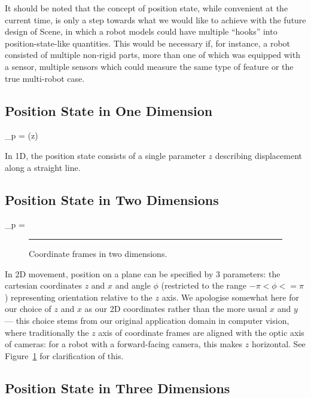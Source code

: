 \documentclass{article}
\begin{document}
It should be noted that the concept of position state, while
convenient at the current time, is only a step towards what we would
like to achieve with the future design of Scene, in which a robot
models could have multiple ``hooks'' into position-state-like
quantities. This would be necessary if, for instance, a robot
consisted of multiple non-rigid parts, more than one of which was
equipped with a sensor, multiple sensors which could measure the same
type of feature or the true multi-robot case.

\subsection{Position State in One Dimension}

\beq
\vecx_p = (z)
\eeq

In 1D, the position state consists of a single parameter $z$
describing displacement along a straight line.

\subsection{Position State in Two Dimensions}

\beq
\vecx_p = 
\eeq

\begin{figure}[t]
  \centerline{
  }
  \caption{\label{fig:2d}
    Coordinate frames in two dimensions.
  }
  \vspace{2mm} \hrule
\end{figure}

In 2D movement, position on a plane can be specified by 3 parameters:
the cartesian coordinates $z$ and $x$ and angle $\phi$ (restricted to
the range $-\pi < \phi <= \pi$) representing orientation relative to
the $z$ axis. We apologise somewhat here for our choice of $z$ and $x$
as our 2D coordinates rather than the more usual $x$ and $y$ --- this
choice stems from our original application domain in computer vision,
where traditionally the $z$ axis of coordinate frames are aligned with
the optic axis of cameras: for a robot with a forward-facing camera,
this makes $z$ horizontal. See Figure~\ref{fig:2d} for clarification
of this.

\subsection{Position State in Three Dimensions}
\end{document}
